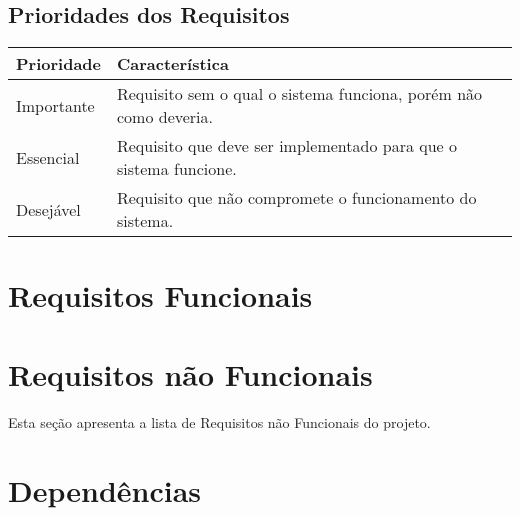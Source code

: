 \documentclass{article}
\begin{document}
	\subsection{Prioridades dos Requisitos}

	\begin{table}[H]
		\begin{center}
			\begin{tabular}[pos]{|m{2cm} | m{12cm}|} \hline
			\cellcolor[gray]{0.9}\textbf{Prioridade} & \cellcolor[gray]{0.9}\textbf{Característica} \\ \hline
			Importante      & Requisito sem o qual o sistema funciona, porém não como deveria.  \\ \hline
			Essencial       & Requisito que deve ser implementado para que o sistema funcione.  \\ \hline
			Desejável       & Requisito que não compromete o funcionamento do sistema.  \\ \hline
			\end{tabular}
		\end{center}
	\end{table}  
		
\section{Requisitos Funcionais}
		
	
	
	
	
	
			  
\section{Requisitos não Funcionais}
Esta seção apresenta a lista de Requisitos não Funcionais do projeto.
		  
	
		  
\section{Dependências}
	
	  
	
% 
% 
		  
\end{document}
